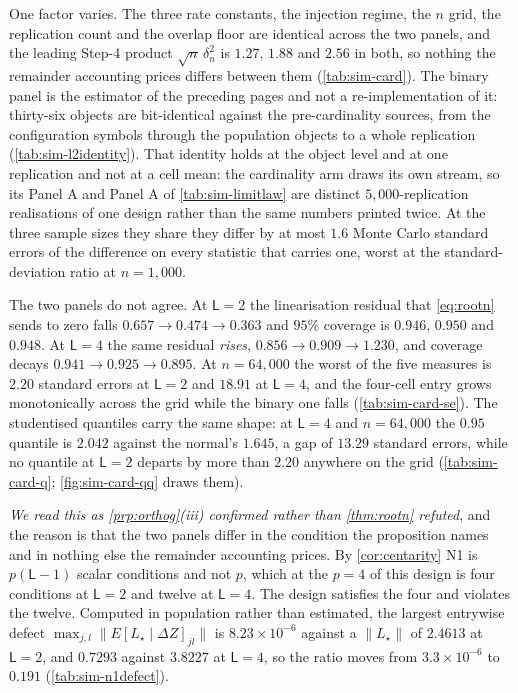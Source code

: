 \documentclass[
  12pt]{article}
\newcommand{\1}[1]{\mathds{1}\left[#1\right]}
\theoremstyle{plain}
\theoremstyle{definition}
\theoremstyle{definition}
\theoremstyle{remark}
\begin{document}
One factor varies. The three rate constants, the injection regime, the $n$ grid,
the replication count and the overlap floor are identical across the two panels,
and the leading Step-4 product $\sqrt n\,\delta_n^{2}$ is $1.27$, $1.88$ and
$2.56$ in both, so nothing the remainder accounting prices differs between them
(\cref{tab:sim-card}). The binary panel is the estimator of the preceding pages
and not a re-implementation of it: thirty-six objects are bit-identical against
the pre-cardinality sources, from the configuration symbols through the
population objects to a whole replication (\cref{tab:sim-l2identity}). That
identity holds at the object level and at one replication and not at a cell mean:
the cardinality arm draws its own stream, so its Panel A and Panel A of
\cref{tab:sim-limitlaw} are distinct $5{,}000$-replication realisations of one
design rather than the same numbers printed twice. At the three sample sizes they
share they differ by at most $1.6$ Monte Carlo standard errors of the difference
on every statistic that carries one, worst at the standard-deviation ratio at
$n=1{,}000$.

The two panels do not agree. At $\mathsf L=2$ the linearisation residual that
\eqref{eq:rootn} sends to zero falls $0.657\to0.474\to0.363$ and $95\%$ coverage
is $0.946$, $0.950$ and $0.948$. At $\mathsf L=4$ the same residual \emph{rises},
$0.856\to0.909\to1.230$, and coverage decays $0.941\to0.925\to0.895$. At
$n=64{,}000$ the worst of the five measures is $2.20$ standard errors at
$\mathsf L=2$ and $18.91$ at $\mathsf L=4$, and the four-cell entry grows
monotonically across the grid while the binary one falls
(\cref{tab:sim-card-se}). The studentised quantiles carry the same shape: at
$\mathsf L=4$ and $n=64{,}000$ the $0.95$ quantile is $2.042$ against the
normal's $1.645$, a gap of $13.29$ standard errors, while no quantile at
$\mathsf L=2$ departs by more than $2.20$ anywhere on the grid
(\cref{tab:sim-card-q}; \cref{fig:sim-card-qq} draws them).

\emph{We read this as \cref{prp:orthog}(iii) confirmed rather than \cref{thm:rootn}
refuted}, and the reason is that the two panels differ in the condition the
proposition names and in nothing else the remainder accounting prices. By
\cref{cor:centarity} N1 is $p(\mathsf L-1)$ scalar conditions and not $p$, which
at the $p=4$ of this design is four conditions at $\mathsf L=2$ and twelve at
$\mathsf L=4$. The design satisfies the four and violates the twelve. Computed in
population rather than estimated, the largest entrywise defect
$\max_{j,l}\|E[L_\star\mid\Delta Z]_{jl}\|$ is $8.23\times10^{-6}$ against a
$\|L_\star\|$ of $2.4613$ at $\mathsf L=2$, and $0.7293$ against $3.8227$ at
$\mathsf L=4$, so the ratio moves from $3.3\times10^{-6}$ to $0.191$
(\cref{tab:sim-n1defect}).
\end{document}

